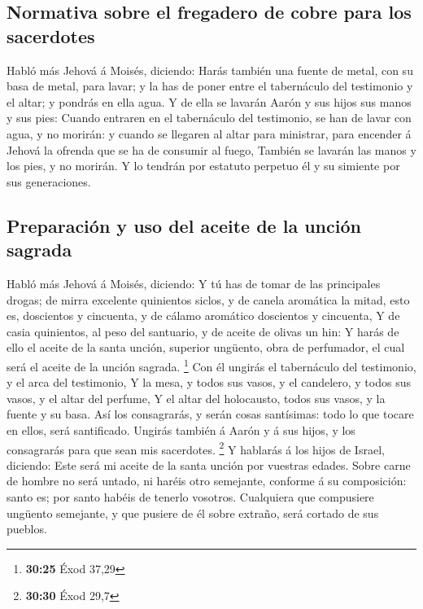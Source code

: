 \hypertarget{normativa-sobre-el-fregadero-de-cobre-para-los-sacerdotes}{%
\subsection{Normativa sobre el fregadero de cobre para los
sacerdotes}\label{normativa-sobre-el-fregadero-de-cobre-para-los-sacerdotes}}

 Habló más Jehová á Moisés, diciendo:  Harás
también una fuente de metal, con su basa de metal, para lavar; y la has
de poner entre el tabernáculo del testimonio y el altar; y pondrás en
ella agua.  Y de ella se lavarán Aarón y sus hijos sus
manos y sus pies:  Cuando entraren en el tabernáculo del
testimonio, se han de lavar con agua, y no morirán: y cuando se llegaren
al altar para ministrar, para encender á Jehová la ofrenda que se ha de
consumir al fuego,  También se lavarán las manos y los
pies, y no morirán. Y lo tendrán por estatuto perpetuo él y su simiente
por sus generaciones.

\hypertarget{preparaciuxf3n-y-uso-del-aceite-de-la-unciuxf3n-sagrada}{%
\subsection{Preparación y uso del aceite de la unción
sagrada}\label{preparaciuxf3n-y-uso-del-aceite-de-la-unciuxf3n-sagrada}}

 Habló más Jehová á Moisés, diciendo:  Y tú
has de tomar de las principales drogas; de mirra excelente quinientos
siclos, y de canela aromática la mitad, esto es, doscientos y cincuenta,
y de cálamo aromático doscientos y cincuenta,  Y de casia
quinientos, al peso del santuario, y de aceite de olivas un hin:
 Y harás de ello el aceite de la santa unción, superior
ungüento, obra de perfumador, el cual será el aceite de la unción
sagrada. \footnote{\textbf{30:25} Éxod 37,29}  Con él
ungirás el tabernáculo del testimonio, y el arca del testimonio,
 Y la mesa, y todos sus vasos, y el candelero, y todos sus
vasos, y el altar del perfume,  Y el altar del holocausto,
todos sus vasos, y la fuente y su basa.  Así los
consagrarás, y serán cosas santísimas: todo lo que tocare en ellos, será
santificado.  Ungirás también á Aarón y á sus hijos, y los
consagrarás para que sean mis sacerdotes. \footnote{\textbf{30:30} Éxod
  29,7}  Y hablarás á los hijos de Israel, diciendo: Este
será mi aceite de la santa unción por vuestras edades. 
Sobre carne de hombre no será untado, ni haréis otro semejante, conforme
á su composición: santo es; por santo habéis de tenerlo vosotros.
 Cualquiera que compusiere ungüento semejante, y que
pusiere de él sobre extraño, será cortado de sus pueblos.

